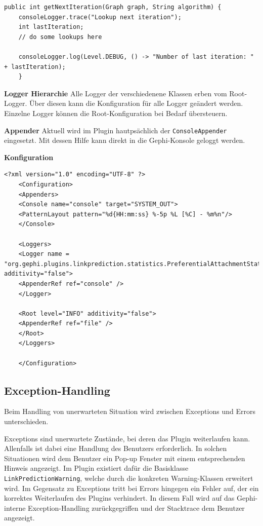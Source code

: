 \begin{lstlisting}[caption={Log-Einträge erzeugen},label=lstLoggerUse]
    public int getNextIteration(Graph graph, String algorithm) {
    consoleLogger.trace("Lookup next iteration");
    int lastIteration;
    // do some lookups here

    consoleLogger.log(Level.DEBUG, () -> "Number of last iteration: " + lastIteration);
    }
\end{lstlisting}

\textbf{Logger Hierarchie}
Alle Logger der verschiedenene Klassen erben vom Root-Logger. Über diesen kann die Konfiguration für alle Logger geändert werden.
Einzelne Logger können die Root-Konfiguration bei Bedarf übersteuern.

\textbf{Appender}
Aktuell wird im Plugin hautpsächlich der \texttt{ConsoleAppender} eingesetzt.
Mit dessen Hilfe kann direkt in die Gephi-Konsole geloggt werden.

\textbf{Konfiguration}

\begin{lstlisting}[caption={log4j.xml},label=lstLoggerCreate]
    <?xml version="1.0" encoding="UTF-8" ?>
    <Configuration>
    <Appenders>
    <Console name="console" target="SYSTEM_OUT">
    <PatternLayout pattern="%d{HH:mm:ss} %-5p %L [%C] - %m%n"/>
    </Console>

    <Loggers>
    <Logger name = "org.gephi.plugins.linkprediction.statistics.PreferentialAttachmentStatistics" additivity="false">
    <AppenderRef ref="console" />
    </Logger>

    <Root level="INFO" additivity="false">
    <AppenderRef ref="file" />
    </Root>
    </Loggers>

    </Configuration>
\end{lstlisting}

\subsection{Exception-Handling}
\label{exceptionhandling}

Beim Handling von unerwarteten Situation wird zwischen Exceptions und Errors unterschieden.

Exceptions sind unerwartete Zustände, bei deren das Plugin weiterlaufen kann. Allenfalls ist dabei eine Handlung des Benutzers erforderlich.
In solchen Situationen wird dem Benutzer ein Pop-up Fenster mit einem entsprechenden Hinweis angezeigt.
Im Plugin existiert dafür die Basisklasse \texttt{LinkPredictionWarning}, welche durch die konkreten Warning-Klassen erweitert wird.
Im Gegensatz zu Exceptions tritt bei Errors hingegen ein Fehler auf, der ein korrektes Weiterlaufen des Plugins verhindert.
In diesem Fall wird auf das Gephi-interne Exception-Handling zurückgegriffen und der Stacktrace dem Benutzer angezeigt.

